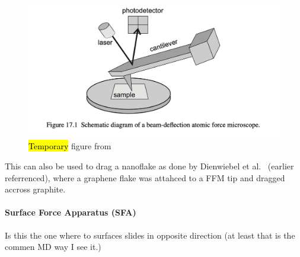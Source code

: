 \begin{figure}[H]
  \centering
  \includegraphics[width=0.6\linewidth]{figures/theory/AFM.png}
  \caption{\hl{Temporary} figure from \cite[p. 184]{gnecco_meyer_2015}}
  \label{fig:AFM}
\end{figure}


This can also be used to drag a nanoflake as done by Dienwiebel et al.\ \cite{DIENWIEBEL2005197} (earlier referrenced), where a graphene flake was attahced to a FFM tip and dragged accross graphite.




\paragraph*{Surface Force Apparatus (SFA)}

Is this the one where to surfaces slides in opposite direction (at least that is the commen MD way I see it.)



















